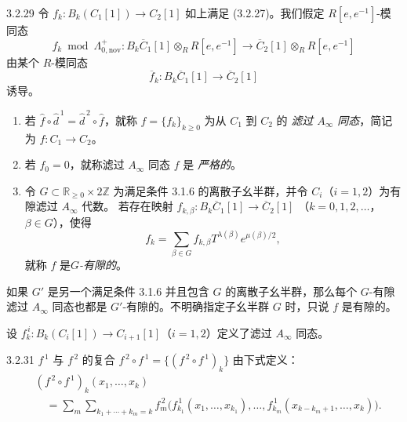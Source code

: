 \begin{definition}{3.2.29}\label{def:3-2-29}
令 $f_k\colon B_k(C_1[1])\to C_2[1]$ 如上满足 (3.2.27)。我们假定
$R[e,e^{-1}]$-模同态
\[
  f_k\bmod\Lambda^+_{0,\mathrm{nov}}\colon
  B_k\overline C_1[1]\otimes_RR[e,e^{-1}]
  \longrightarrow
  \overline C_2[1]\otimes_RR[e,e^{-1}]
\]
由某个 $R$-模同态
\[
  \overline f_k\colon
  B_k\overline C_1[1]\longrightarrow\overline C_2[1]
\]
诱导。
\begin{enumerate}[label=\textup{(\arabic*)},leftmargin=2.8em]
  \item 若
  $\widehat f\circ\widehat d^{\,1}
  =\widehat d^{\,2}\circ\widehat f$，就称
  $f=\{f_k\}_{k\geq0}$ 为从 $C_1$ 到 $C_2$ 的
  \emph{滤过 $A_\infty$ 同态}，简记为
  $f\colon C_1\to C_2$。

  \item 若 $f_0=0$，就称滤过 $A_\infty$ 同态 $f$ 是
  \emph{严格的}。

  \item 令 $G\subset\mathbb R_{\geq0}\times2\mathbb Z$ 为满足条件 3.1.6
  的离散子幺半群，并令 $C_i$（$i=1,2$）为有隙滤过 $A_\infty$ 代数。
  若存在映射
  $f_{k,\beta}\colon B_k\overline C_1[1]\to\overline C_2[1]$
  （$k=0,1,2,\ldots$，$\beta\in G$），使得
  \begin{equation}
    f_k=\sum_{\beta\in G}f_{k,\beta}
    T^{\lambda(\beta)}e^{\mu(\beta)/2},
    \tag{3.2.30}\label{eq:3-2-30}
  \end{equation}
  就称 $f$ 是\emph{$G$-有隙的}。
\end{enumerate}
\end{definition}

如果 $G'$ 是另一个满足条件 3.1.6 并且包含 $G$ 的离散子幺半群，那么每个
$G$-有隙滤过 $A_\infty$ 同态也都是 $G'$-有隙的。不明确指定子幺半群
$G$ 时，只说 $f$ 是有隙的。

设 $f_k^{\,i}\colon B_k(C_i[1])\to C_{i+1}[1]$（$i=1,2$）定义了滤过
$A_\infty$ 同态。

\begin{definition}{3.2.31}\label{def:3-2-31}
$f^{\,1}$ 与 $f^{\,2}$ 的复合
$f^{\,2}\circ f^{\,1}=\{(f^{\,2}\circ f^{\,1})_k\}$
由下式定义：
\[
\begin{aligned}
  &(f^{\,2}\circ f^{\,1})_k(x_1,\ldots,x_k)\\
  &\quad={}
  \sum_m\sum_{k_1+\cdots+k_m=k}
  f_m^{\,2}\bigl(
    f_{k_1}^{\,1}(x_1,\ldots,x_{k_1}),\ldots,
    f_{k_m}^{\,1}(x_{k-k_m+1},\ldots,x_k)
  \bigr).
\end{aligned}
\]
\end{definition}

